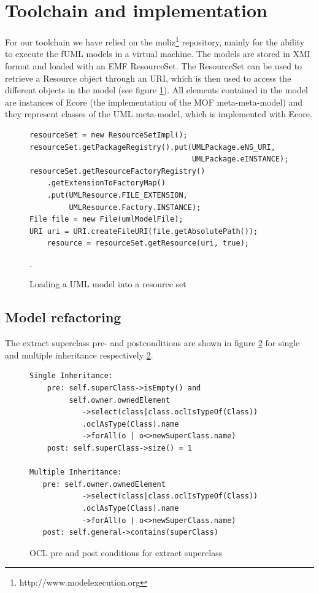 \documentclass{llncs}
\begin{document}
\section{Toolchain and implementation}
\label{sec:toolchain}
For our toolchain we have relied on the moliz\footnote{http://www.modelexecution.org} repository, mainly for the ability to execute the fUML 
models in a virtual machine. The models are stored in XMI format and loaded with an EMF ResourceSet. The ResourceSet
can be used to retrieve a Resource object through an URI, which is then used to access the different objects in the model 
(see figure \ref{lst:resourceset}). All elements contained in the model are instances of Ecore (the implementation of
the MOF meta-meta-model) and they represent classes of the UML meta-model, which is implemented with Ecore.

\begin{figure}
 \begin{lstlisting}
resourceSet = new ResourceSetImpl();
resourceSet.getPackageRegistry().put(UMLPackage.eNS_URI,
                                     UMLPackage.eINSTANCE);
resourceSet.getResourceFactoryRegistry()
    .getExtensionToFactoryMap()
    .put(UMLResource.FILE_EXTENSION,
         UMLResource.Factory.INSTANCE);
File file = new File(umlModelFile);
URI uri = URI.createFileURI(file.getAbsolutePath());
    resource = resourceSet.getResource(uri, true);
 \end{lstlisting}
 \caption{Loading a UML model into a resource set}.
 \label{lst:resourceset}
\end{figure}

\subsection{Model refactoring}
The extract superclass pre- and postconditions are shown in figure \ref{lst:oclsuperclass} for single and multiple 
inheritance respectively \ref{lst:oclsuperclass}.

\begin{figure}[h!t]
 \begin{lstlisting}
Single Inheritance:
    pre: self.superClass->isEmpty() and 
         self.owner.ownedElement
            ->select(class|class.oclIsTypeOf(Class))
            .oclAsType(Class).name
            ->forAll(o | o<>newSuperClass.name)
    post: self.superClass->size() = 1

Multiple Inheritance:
   pre: self.owner.ownedElement
            ->select(class|class.oclIsTypeOf(Class))
            .oclAsType(Class).name
            ->forAll(o | o<>newSuperClass.name)
   post: self.general->contains(superClass)
 \end{lstlisting}
 \caption{OCL pre and post conditions for extract superclass}
 \label{lst:oclsuperclass}
\end{figure}
\end{document}
